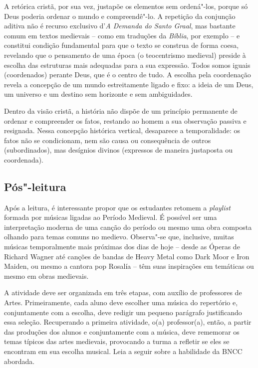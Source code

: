 \documentclass[11pt]{extarticle}
\begin{document}
A retórica cristã, por sua vez, justapõe os
elementos sem ordená"-los, porque só Deus poderia ordenar o mundo e
compreendê"-lo. A repetição da conjunção aditiva não é recurso exclusivo
d'\emph{A Demanda do Santo Graal}, mas bastante comum em textos
medievais -- como em traduções da \emph{Bíblia}, por exemplo -- e
constitui condição fundamental para que o texto se construa de forma
coesa, revelando que o pensamento de uma época (o teocentrismo medieval)
preside à escolha das estruturas mais adequadas para a sua expressão.
Todos somos iguais (coordenados) perante Deus, que é o centro de tudo. A
escolha pela coordenação revela a concepção de um mundo estreitamente
ligado e fixo: a ideia de um Deus, um universo e um destino sem
horizonte e sem ambiguidades.

Dentro da visão cristã, a história não dispõe de um princípio permanente
de ordenar e compreender os fatos, restando ao homem a sua observação
passiva e resignada. Nessa concepção histórica vertical, desaparece a
temporalidade: os fatos não se condicionam, nem são causa ou
consequência de outros (subordinados), mas desígnios divinos (expressos
de maneira justaposta ou coordenada).


\subsection{Pós"-leitura}


Após a leitura, é interessante propor que os estudantes
retomem a \emph{playlist} formada por músicas ligadas ao Período
Medieval. É possível ser uma interpretação moderna de uma canção do
período ou mesmo uma obra composta olhando para temas comuns no medievo.
Observa"-se que, inclusive, muitas músicas temporalmente mais próximas
dos dias de hoje -- desde as Óperas de Richard Wagner até canções de
bandas de Heavy Metal como Dark Moor e Iron Maiden, ou mesmo a cantora
pop Rosalía -- têm suas inspirações em temáticas ou mesmo em obras
medievais.

A atividade deve ser organizada em três etapas, com auxílio de
professores de Artes. Primeiramente, cada aluno deve escolher uma música
do repertório e, conjuntamente com a escolha, deve redigir um pequeno
parágrafo justificando essa seleção. Recuperando a primeira atividade,
o(a) professor(a), então, a partir das produções dos alunos e
conjuntamente com a música, deve rememorar os temas típicos das artes
medievais, provocando a turma a refletir se eles se encontram em sua
escolha musical. 
Leia a seguir sobre a habilidade da BNCC abordada.
\end{document}
